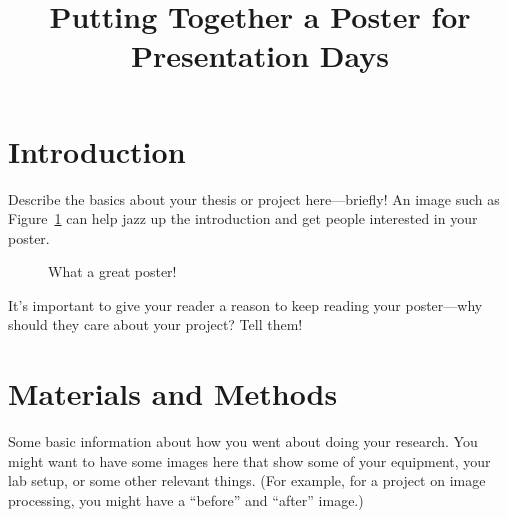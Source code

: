 \documentclass[clinic]{hmcposter}
\title{Putting Together a Poster for Presentation Days}
\begin{document}
\begin{poster}

\section{Introduction}

Describe the basics about your thesis or project here---briefly!  An
image such as Figure~\ref{fig:our-poster} can help jazz up the
introduction and get people interested in your poster.

\begin{figure}
\begin{center}
\caption{What a great poster!}%
\label{fig:our-poster}
\end{center}
\end{figure}

It's important to give your reader a reason to keep reading your
poster---why should they care about your project?  Tell them!


\section{Materials and Methods}%

Some basic information about how you went about doing your
research.  You might want to have some images here that show some of
your equipment, your lab setup, or some other relevant things.  (For
example, for a project on image processing, you might have a
``before'' and ``after'' image.)


\end{poster}
\end{document}
